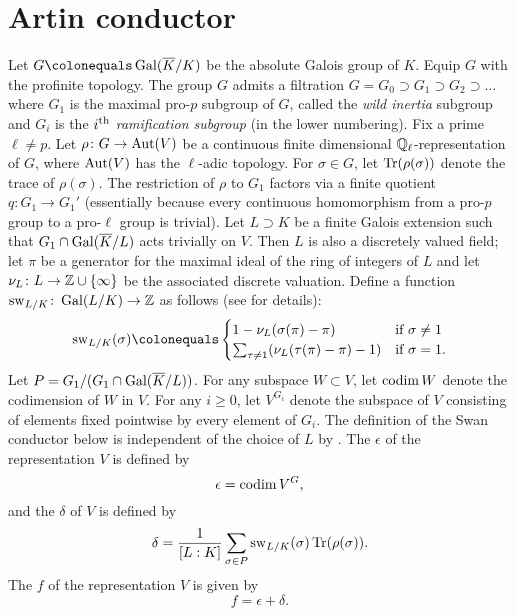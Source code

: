 \section{Artin conductor}\label{defcond}
Let $G \colonequals \Gal (\overline{K}/K)$ be the absolute Galois group of $K$. Equip $G$ with the profinite topology. The group $G$ admits a filtration
$ G = G_0 \supset G_1 \supset G_2 \supset \ldots $
where $G_1$ is the maximal pro-$p$ subgroup of $G$, called the {\textit{wild inertia}} subgroup and $G_i$ is the {\textit{$i^{\textup{th}}$ ramification subgroup}} (in the lower numbering). Fix a prime $\ell \neq p$. Let $\rho \colon G \rightarrow \operatorname{Aut}(V)$ be a continuous finite dimensional $\mathbb Q_\ell$-representation of $G$, where $\operatorname{Aut}(V)$ has the $\ell$-adic topology. For $\sigma \in G$, let $\operatorname{Tr}(\rho(\sigma))$ denote the trace of $\rho(\sigma)$. The restriction of $\rho$ to $G_1$ factors via a finite quotient $q \colon G_1 \rightarrow G_1'$ (essentially because every continuous homomorphism from a pro-$p$ group to a pro-$\ell$ group is trivial). Let $L \supset K$ be a finite Galois extension such that $G_1 \cap \operatorname{Gal} (\overline{K}/L)$ acts trivially on $V$. Then $L$ is also a discretely valued field; let $\pi$ be a generator for the maximal ideal of the ring of integers of $L$ and let $\nu_L \colon L \rightarrow \mathbb Z \cup \{\infty\}$ be the associated discrete valuation. Define a function $\operatorname{sw}_{L/K} \colon \operatorname{Gal}(L/K) \rightarrow \mathbb Z$ as follows (see \cite[Section~6.1]{katosaito} for details):
\[ \sw_{L/K}(\sigma) \colonequals \begin{cases}
                                   1 - \nu_L(\sigma(\pi)-\pi) & \textup{if } \sigma \neq 1 \\
                                   \sum_{\tau \neq 1} (\nu_L(\tau(\pi)-\pi) -1) & \textup{if } \sigma = 1.
                                  \end{cases}
\]
Let $P = G_1/(G_1 \cap \operatorname{Gal}(\overline{K}/L))$. For any subspace $W \subset V$, let $\operatorname{codim} W$ denote the codimension of $W$ in $V$. For any $i \geq 0$, let $V^{G_i}$ denote the subspace of $V$ consisting of elements fixed pointwise by every element of $G_i$. The definition of the Swan conductor below is independent of the choice of $L$ by \cite[Lemma~6.1.1.1]{katosaito}. The {} $\epsilon$ of the representation $V$ is defined by 
\[ \epsilon = \operatorname{codim} V^G,  \]
and the {} $\delta$ of $V$ is defined by
\[ \delta = \frac{1}{[L:K]}\sum_{\sigma \in P} \operatorname{sw}_{L/K}(\sigma) \operatorname{Tr}(\rho(\sigma)).\]
The {} $f$ of the representation $V$ is given by 
\[ f = \epsilon + \delta . \]

